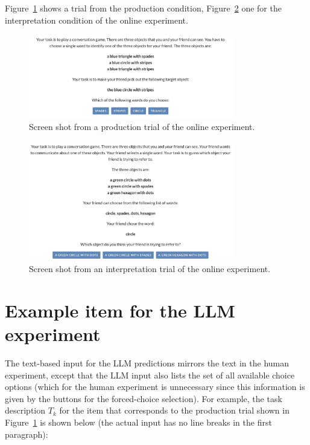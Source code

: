\documentclass[fleqn]{article}
\begin{document}
Figure~\ref{fig:refgame-screenshot-production} shows a trial from the production condition, Figure~\ref{fig:refgame-screenshot-interpretation} one for the interpretation condition of the online experiment.

\begin{figure}[H]
  \centering
  \includegraphics[width = 0.8\textwidth]{00-pics/refgame-production.png}

  \caption{Screen shot from a production trial of the online experiment.}
  \label{fig:refgame-screenshot-production}
\end{figure}

\begin{figure}[H]
  \centering
  \includegraphics[width = 0.8\textwidth]{00-pics/refgame-interpretation.png}

  \caption{Screen shot from an interpretation trial of the online experiment.}
  \label{fig:refgame-screenshot-interpretation}
\end{figure}

\section{Example item for the LLM experiment}
\label{sec:examples-items-llm}

The text-based input for the LLM predictions mirrors the text in the human experiment, except that the LLM input also lists the set of all available choice options (which for the human experiment is unnecessary since this information is given by the buttons for the forced-choice selection).
For example, the task description $T_{k}$ for the item that corresponds to the production trial shown in Figure~\ref{fig:refgame-screenshot-production} is shown below (the actual input has no line breaks in the first paragraph):
\end{document}
